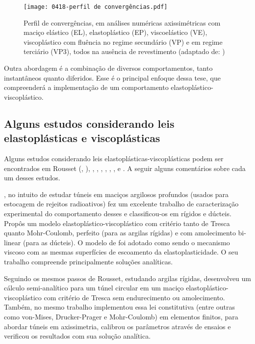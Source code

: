 \begin{figure}[H]
	\begin{center}
		\texttt{[image: 0418-perfil de convergências.pdf]}
	\end{center}
	\caption{\label{perfil_convergencias_sterpi}Perfil de convergências, em análises numéricas axissimétricas com maciço elástico (EL), elastoplástico (EP), viscoelástico (VE), viscoplástico com fluência no regime secundário (VP) e em regime terciário (VP3), todos na ausência de revestimento (adaptado de: )}
\end{figure}

Outra abordagem é a combinação de diversos comportamentos, tanto instantâneos quanto diferidos. Esse é o principal enfoque dessa tese, que compreenderá a implementação de um comportamento elastoplástico-viscoplástico.

\subsection{Alguns estudos considerando leis elastoplásticas e viscoplásticas}

Alguns estudos considerando leis elastoplásticas-viscoplásticas podem ser encontrados em Rousset (\citeyear{Rousset1988}, \citeyear{Rousset1990}), , , , , , ,  e . A seguir alguns comentários sobre cada um desses estudos.

\textbf{}, no intuito de estudar túneis em maciços argilosos profundos (usados para estocagem de rejeitos radioativos) fez um excelente trabalho de caracterização experimental do comportamento desses e classificou-os em rígidos e dúcteis. Propôs um modelo elastoplástico-viscoplástico com critério tanto de Tresca quanto Mohr-Coulomb, perfeito (para as argilas rígidas) e com amolecimento bi-linear (para as dúcteis). O modelo de  foi adotado como sendo o mecanismo viscoso com as mesmas superfícies de escoamento da elastoplasticidade. O seu trabalho compreende principalmente soluções analíticas.

Seguindo os mesmos passos de Rousset, \textbf{} estudando argilas rígidas, desenvolveu um cálculo semi-analítico para um túnel circular em um maciço elastoplástico-viscoplástico com critério de Tresca sem endurecimento ou amolecimento. Também, no mesmo trabalho implementou essa lei constitutiva (entre outras como von-Mises, Drucker-Prager e Mohr-Coulomb) em elementos finitos, para abordar túneis em axissimetria, calibrou os parâmetros através de ensaios e verificou os resultados com sua solução analítica.

